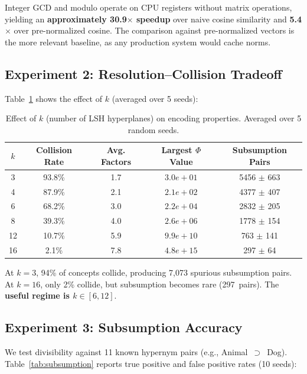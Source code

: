 \documentclass[10pt]{article}
\begin{document}
\noindent Integer GCD and modulo operate on CPU registers without matrix operations, yielding an \textbf{approximately 30.9$\times$ speedup} over naive cosine similarity and \textbf{5.4$\times$} over pre-normalized cosine. The comparison against pre-normalized vectors is the more relevant baseline, as any production system would cache norms.

\subsection{Experiment 2: Resolution--Collision Tradeoff}

Table~\ref{tab:ksweep} shows the effect of $k$ (averaged over 5 seeds):

\begin{table}[ht]
\centering
\caption{Effect of $k$ (number of LSH hyperplanes) on encoding properties. Averaged over 5 random seeds.}
\label{tab:ksweep}
\begin{tabular}{ccccc}
\toprule
$k$ & Collision Rate & Avg. Factors & Largest $\Phi$ Value & Subsumption Pairs \\
\midrule
3 & 93.8\% & 1.7 & $3.0e+01$ & 5456 $\pm$ 663 \\
4 & 87.9\% & 2.1 & $2.1e+02$ & 4377 $\pm$ 407 \\
6 & 68.2\% & 3.0 & $2.2e+04$ & 2832 $\pm$ 205 \\
8 & 39.3\% & 4.0 & $2.6e+06$ & 1778 $\pm$ 154 \\
12 & 10.7\% & 5.9 & $9.9e+10$ & 763 $\pm$ 141 \\
16 & 2.1\% & 7.8 & $4.8e+15$ & 297 $\pm$ 64 \\
\bottomrule
\end{tabular}
\end{table}

\noindent At $k\!=\!3$, 94\% of concepts collide, producing 7{,}073 spurious subsumption pairs. At $k\!=\!16$, only 2\% collide, but subsumption becomes rare (297~pairs). The \textbf{useful regime is $k \in [6, 12]$}.

\subsection{Experiment 3: Subsumption Accuracy}

We test divisibility against 11 known hypernym pairs (e.g., Animal~$\supset$~Dog). Table~\ref{tab:subsumption} reports true positive and false positive rates (10 seeds):
\end{document}
